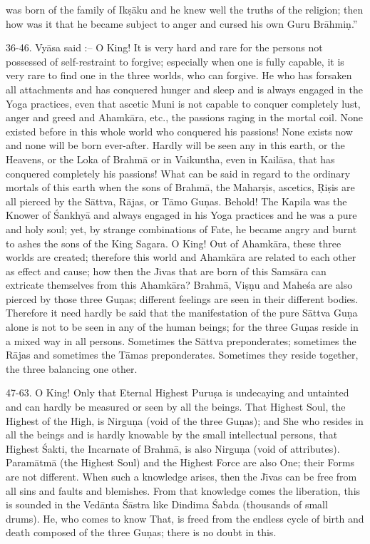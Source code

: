 was born of the family of Ik\d{s}\=aku and he knew well the truths of the religion; then how was it that he became subject to anger and cursed his own Guru Br\=ahmi\d{n}.''

36-46. Vy\=asa said :-- O King! It is very hard and rare for the persons not possessed of self-restraint to forgive; especially when one is fully capable, it is very rare to find one in the three worlds, who can forgive. He who has forsaken all attachments and has conquered hunger and sleep and is always engaged in the Yoga practices, even that ascetic Muni is not capable to conquer completely lust, anger and greed and Ahamk\=ara, etc., the passions raging in the mortal coil. None existed before in this whole world who conquered his passions! None exists now and none will be born ever-after. Hardly will be seen any in this earth, or the Heavens, or the Loka of Brahm\=a or in Vaikuntha, even in Kail\=asa, that has conquered completely his passions! What can be said in regard to the ordinary mortals of this earth when the sons of Brahm\=a, the Mahar\d{s}is, ascetics, \d{R}i\d{s}is are all pierced by the S\=attva, R\=ajas, or T\=amo Gu\d{n}as. Behold! The Kapila was the Knower of \'Sankhy\=a and always engaged in his Yoga practices and he was a pure and holy soul; yet, by strange combinations of Fate, he became angry and burnt to ashes the sons of the King Sagara. O King! Out of Ahamk\=ara, these three worlds are created; therefore this world and Ahamk\=ara are related to each other as effect and cause; how then the J\={\i}vas that are born of this Sams\=ara can extricate themselves from this Ahamk\=ara? Brahm\=a, Vi\d{s}\d{n}u and Mahe\'sa are also pierced by those three Gu\d{n}as; different feelings are seen in their different bodies. Therefore it need hardly be said that the manifestation of the pure S\=attva Gu\d{n}a alone is not to be seen in any of the human beings; for the three Gu\d{n}as reside in a mixed way in all persons. Sometimes the S\=attva preponderates; sometimes the R\=ajas and sometimes the T\=amas preponderates. Sometimes they reside together, the three balancing one other.

47-63. O King! Only that Eternal Highest Puru\d{s}a is undecaying and untainted and can hardly be measured or seen by all the beings. That Highest Soul, the Highest of the High, is Nirgu\d{n}a (void of the three Gu\d{n}as); and She who resides in all the beings and is hardly knowable by the small intellectual persons, that Highest \'Sakti, the Incarnate of Brahm\=a, is also Nirgu\d{n}a (void of attributes). Param\=atm\=a (the Highest Soul) and the Highest Force are also One; their Forms are not different. When such a knowledge arises, then the J\={\i}vas can be free from all sins and faults and blemishes. From that knowledge comes the liberation, this is sounded in the Ved\=anta \'S\=astra like Dindima \'Sabda (thousands of small drums). He, who comes to know That, is freed from the endless cycle of birth and death composed of the three Gu\d{n}as; there is no doubt in this.

